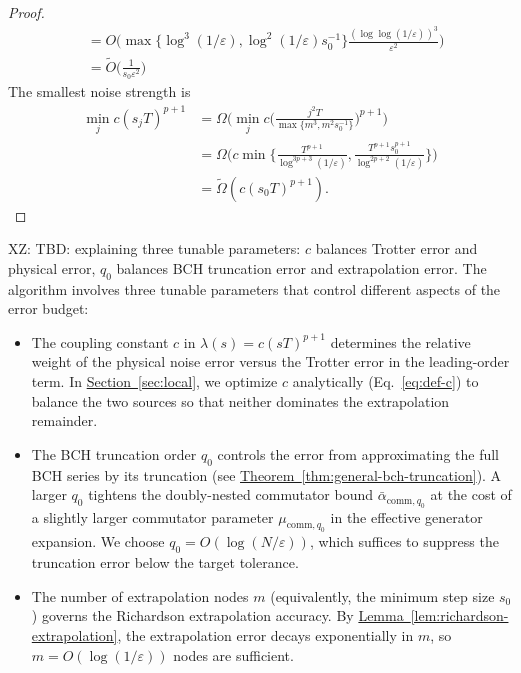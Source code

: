\documentclass[11pt]{article}
\newcommand{\thm}[1]{\hyperref[thm:#1]{Theorem~\ref*{thm:#1}}}
\newcommand{\lem}[1]{\hyperref[lem:#1]{Lemma~\ref*{lem:#1}}}
\renewcommand{\sec}[1]{\hyperref[sec:#1]{Section~\ref*{sec:#1}}}
\newcommand{\eps}{\varepsilon}
\newcommand{\xz}[1]{{\color{cyan} XZ: #1}}
\begin{document}
\begin{proof}
\begin{align*}
        &=O\Big( \max\{\log^3(1/\eps), \log^2(1/\eps)s_0^{-1}\}\frac{(\log\log (1/\eps))^3}{\eps^2}\Big) \\
        &= \widetilde{O}\Big(\frac{1}{s_0\eps^2}\Big)
    \end{align*}
    The smallest noise strength is \begin{align*}
        \min_{j}c(s_jT)^{p+1} &= \Omega\Big(\min_{j}c\Big(\frac{j^2T}{\max\{m^3, m^2s_0^{-1}\}}\Big)^{p+1}\Big) \\
        &=\Omega\Big(c\min\Big\{\frac{T^{p+1}}{\log^{3p+3}(1/\eps)}, \frac{ T^{p+1}s_0^{p+1}}{\log^{2p+2}(1/\eps)}\Big\}\Big)\\
        & = \widetilde{\Omega}(c (s_0 T)^{p+1}).
    \end{align*}
\end{proof}
\xz{TBD: explaining three tunable parameters: $c$ balances Trotter error and physical error, $q_0$ balances BCH truncation error and extrapolation error.}
The algorithm involves three tunable parameters that control different aspects of the error budget:
\begin{itemize}
    \item The coupling constant $c$ in $\lambda(s)=c(sT)^{p+1}$ determines the relative weight of the physical noise error versus the Trotter error in the leading-order term. In \sec{local}, we optimize $c$ analytically (Eq.~\eqref{eq:def-c}) to balance the two sources so that neither dominates the extrapolation remainder.
    \item The BCH truncation order $q_0$ controls the error from approximating the full BCH series by its truncation (see \thm{general-bch-truncation}). A larger $q_0$ tightens the doubly-nested commutator bound $\bar{\alpha}_{\mathrm{comm},q_0}$ at the cost of a slightly larger commutator parameter $\mu_{\mathrm{comm},q_0}$ in the effective generator expansion. We choose $q_0 = O(\log(N/\eps))$, which suffices to suppress the truncation error below the target tolerance.
    \item The number of extrapolation nodes $m$ (equivalently, the minimum step size $s_0$) governs the Richardson extrapolation accuracy. By \lem{richardson-extrapolation}, the extrapolation error decays exponentially in $m$, so $m = O(\log(1/\eps))$ nodes are sufficient.
\end{itemize}
\end{document}

